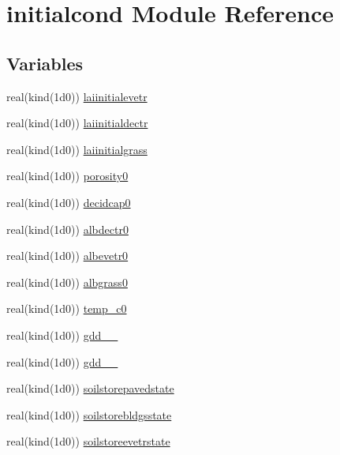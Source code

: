 \hypertarget{namespaceinitialcond}{}\section{initialcond Module Reference}
\label{namespaceinitialcond}
\subsection*{Variables}
\begin{DoxyCompactItemize}
\item 
real(kind(1d0)) \hyperlink{namespaceinitialcond_a8c1600d5904472dceded21c657d2e5f9}{laiinitialevetr}
\item 
real(kind(1d0)) \hyperlink{namespaceinitialcond_a709658b9104b286e2b94a4235cd99d1e}{laiinitialdectr}
\item 
real(kind(1d0)) \hyperlink{namespaceinitialcond_a5af43c64376b810daa4dce52bcea767b}{laiinitialgrass}
\item 
real(kind(1d0)) \hyperlink{namespaceinitialcond_a9c4cad07b3a26a8a84712c2e39ec57d1}{porosity0}
\item 
real(kind(1d0)) \hyperlink{namespaceinitialcond_a09a143cb4c78f0b46e310f6eed172727}{decidcap0}
\item 
real(kind(1d0)) \hyperlink{namespaceinitialcond_a4adfa02ebcb41c5e25a3afaa2fbc79bd}{albdectr0}
\item 
real(kind(1d0)) \hyperlink{namespaceinitialcond_ad69d04d9c931b44b5494a8ca83f02a17}{albevetr0}
\item 
real(kind(1d0)) \hyperlink{namespaceinitialcond_a1690b92f7ee51436213bdce6c0d70dc2}{albgrass0}
\item 
real(kind(1d0)) \hyperlink{namespaceinitialcond_a61adf7674cde4a05c39ceaaecac23076}{temp\+\_\+c0}
\item 
real(kind(1d0)) \hyperlink{namespaceinitialcond_a2d30ed9339c2a7ee9a08bd15cb04e6a4}{gdd\+\_\+\_}
\item 
real(kind(1d0)) \hyperlink{namespaceinitialcond_a7f2ecdcc8fa8441223d109c577f7ce40}{gdd\+\_\+\_}
\item 
real(kind(1d0)) \hyperlink{namespaceinitialcond_aeefca775739fc6fb0d57b02d5ba9c49f}{soilstorepavedstate}
\item 
real(kind(1d0)) \hyperlink{namespaceinitialcond_af657c0f9875b9819e2d30a94b1fa4775}{soilstorebldgsstate}
\item 
real(kind(1d0)) \hyperlink{namespaceinitialcond_a8d369e85991a26996ec9d7b226047194}{soilstoreevetrstate}
\item 

\end{DoxyCompactItemize}

